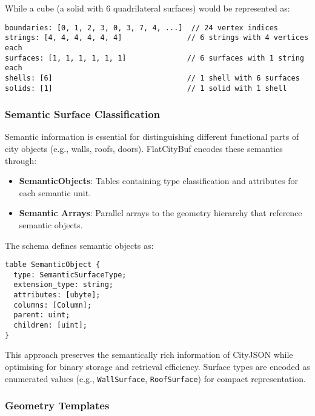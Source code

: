 While a cube (a solid with 6 quadrilateral surfaces) would be represented as:

\begin{verbatim}
boundaries: [0, 1, 2, 3, 0, 3, 7, 4, ...]  // 24 vertex indices
strings: [4, 4, 4, 4, 4, 4]               // 6 strings with 4 vertices each
surfaces: [1, 1, 1, 1, 1, 1]              // 6 surfaces with 1 string each
shells: [6]                               // 1 shell with 6 surfaces
solids: [1]                               // 1 solid with 1 shell
\end{verbatim}

\subsubsection{Semantic Surface Classification}
\label{methodology:feature_encoding:geometry_encoding:semantic_surface_classification}

Semantic information is essential for distinguishing different functional parts of city objects (e.g., walls, roofs, doors). FlatCityBuf encodes these semantics through:

\begin{itemize}
    \item \textbf{SemanticObjects}: Tables containing type classification and attributes for each semantic unit.
    \item \textbf{Semantic Arrays}: Parallel arrays to the geometry hierarchy that reference semantic objects.
\end{itemize}

The schema defines semantic objects as:

\begin{verbatim}
table SemanticObject {
  type: SemanticSurfaceType;
  extension_type: string;
  attributes: [ubyte];
  columns: [Column];
  parent: uint;
  children: [uint];
}
\end{verbatim}

This approach preserves the semantically rich information of CityJSON while optimising for binary storage and retrieval efficiency. Surface types are encoded as enumerated values (e.g., \texttt{WallSurface}, \texttt{RoofSurface}) for compact representation.

\subsubsection{Geometry Templates}
\label{methodology:feature_encoding:geometry_encoding:geometry_templates}

